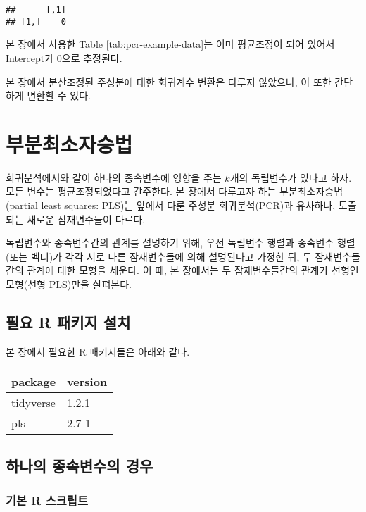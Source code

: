 \documentclass[]{book}
\begin{document}
\begin{verbatim}
##      [,1]
## [1,]    0
\end{verbatim}

본 장에서 사용한 Table \ref{tab:pcr-example-data}는 이미 평균조정이 되어 있어서 Intercept가 0으로 추정된다.

본 장에서 분산조정된 주성분에 대한 회귀계수 변환은 다루지 않았으나, 이 또한 간단하게 변환할 수 있다.

\hypertarget{plsr}{%
\chapter{부분최소자승법}\label{plsr}}

회귀분석에서와 같이 하나의 종속변수에 영향을 주는 \(k\)개의 독립변수가 있다고 하자. 모든 변수는 평균조정되었다고 간주한다. 본 장에서 다루고자 하는 부분최소자승법(partial least squares: PLS)는 앞에서 다룬 주성분 회귀분석(PCR)과 유사하나, 도출되는 새로운 잠재변수들이 다르다.

독립변수와 종속변수간의 관계를 설명하기 위해, 우선 독립변수 행렬과 종속변수 행렬(또는 벡터)가 각각 서로 다른 잠재변수들에 의해 설명된다고 가정한 뒤, 두 잠재변수들간의 관계에 대한 모형을 세운다. 이 때, 본 장에서는 두 잠재변수들간의 관계가 선형인 모형(선형 PLS)만을 살펴본다.

\hypertarget{plsr-packages-install}{%
\section{필요 R 패키지 설치}\label{plsr-packages-install}}

본 장에서 필요한 R 패키지들은 아래와 같다.

\begin{tabular}{l|l}
\hline
package & version\\
\hline
tidyverse & 1.2.1\\
\hline
pls & 2.7-1\\
\hline
\end{tabular}

\hypertarget{plsr-single-target}{%
\section{하나의 종속변수의 경우}\label{plsr-single-target}}

\hypertarget{plsr-basic-script}{%
\subsection{기본 R 스크립트}\label{plsr-basic-script}}
\end{document}
